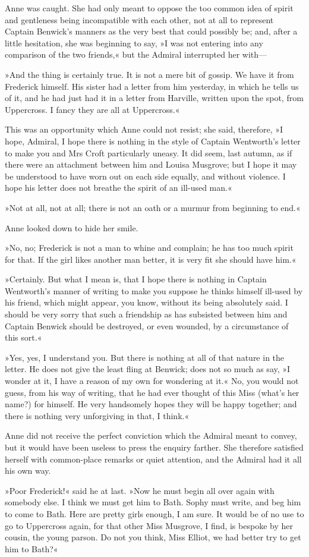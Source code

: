 Anne was caught. She had only meant to oppose the too common idea of spirit and gentleness being incompatible with each other, not at all to represent Captain Benwick's manners as the very best that could possibly be; and, after a little hesitation, she was beginning to say, »I was not entering into any comparison of the two friends,« but the Admiral interrupted her with—

»And the thing is certainly true. It is not a mere bit of gossip. We have it from Frederick himself. His sister had a letter from him yesterday, in which he tells us of it, and he had just had it in a letter from Harville, written upon the spot, from Uppercross. I fancy they are all at Uppercross.«

This was an opportunity which Anne could not resist; she said, therefore, »I hope, Admiral, I hope there is nothing in the style of Captain Wentworth's letter to make you and Mrs Croft particularly uneasy. It did seem, last autumn, as if there were an attachment between him and Louisa Musgrove; but I hope it may be understood to have worn out on each side equally, and without violence. I hope his letter does not breathe the spirit of an ill-used man.«

»Not at all, not at all; there is not an oath or a murmur from beginning to end.«

Anne looked down to hide her smile.

»No, no; Frederick is not a man to whine and complain; he has too much spirit for that. If the girl likes another man better, it is very fit she should have him.«

»Certainly. But what I mean is, that I hope there is nothing in Captain Wentworth's manner of writing to make you suppose he thinks himself ill-used by his friend, which might appear, you know, without its being absolutely said. I should be very sorry that such a friendship as has subsisted between him and Captain Benwick should be destroyed, or even wounded, by a circumstance of this sort.«

»Yes, yes, I understand you. But there is nothing at all of that nature in the letter. He does not give the least fling at Benwick; does not so much as say, »I wonder at it, I have a reason of my own for wondering at it.« No, you would not guess, from his way of writing, that he had ever thought of this Miss (what's her name?) for himself. He very handsomely hopes they will be happy together; and there is nothing very unforgiving in that, I think.«

Anne did not receive the perfect conviction which the Admiral meant to convey, but it would have been useless to press the enquiry farther. She therefore satisfied herself with common-place remarks or quiet attention, and the Admiral had it all his own way.

»Poor Frederick!« said he at last. »Now he must begin all over again with somebody else. I think we must get him to Bath. Sophy must write, and beg him to come to Bath. Here are pretty girls enough, I am sure. It would be of no use to go to Uppercross again, for that other Miss Musgrove, I find, is bespoke by her cousin, the young parson. Do not you think, Miss Elliot, we had better try to get him to Bath?«